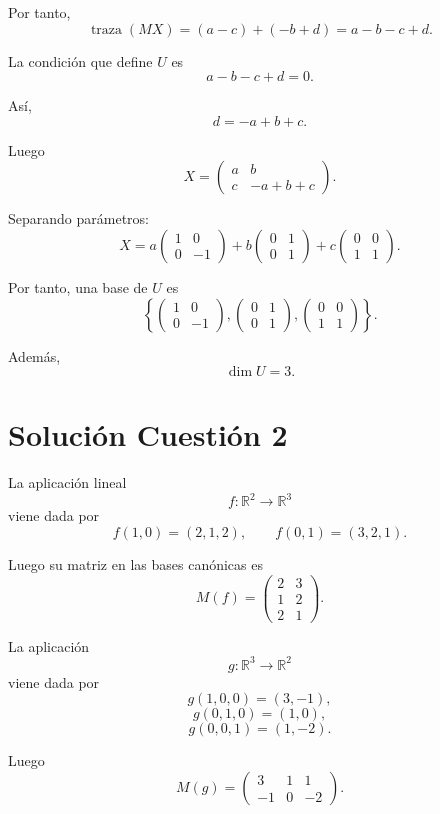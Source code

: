 \documentclass[12pt]{article}
\begin{document}
Por tanto,
\[
\operatorname{traza}(MX)=(a-c)+(-b+d)=a-b-c+d.
\]

La condición que define \(U\) es
\[
a-b-c+d=0.
\]

Así,
\[
d=-a+b+c.
\]

Luego
\[
X=
\begin{pmatrix}
a&b\\
c&-a+b+c
\end{pmatrix}.
\]

Separando parámetros:
\[
X=
a
\begin{pmatrix}
1&0\\
0&-1
\end{pmatrix}
+b
\begin{pmatrix}
0&1\\
0&1
\end{pmatrix}
+c
\begin{pmatrix}
0&0\\
1&1
\end{pmatrix}.
\]

Por tanto, una base de \(U\) es
\[
\boxed{
\left\{
\begin{pmatrix}
1&0\\
0&-1
\end{pmatrix},
\begin{pmatrix}
0&1\\
0&1
\end{pmatrix},
\begin{pmatrix}
0&0\\
1&1
\end{pmatrix}
\right\}.
}
\]

Además,
\[
\boxed{\dim U=3.}
\]

\section*{Solución Cuestión 2}

La aplicación lineal
\[
f:\mathbb{R}^2\longrightarrow\mathbb{R}^3
\]
viene dada por
\[
f(1,0)=(2,1,2),
\qquad
f(0,1)=(3,2,1).
\]

Luego su matriz en las bases canónicas es
\[
M(f)=
\begin{pmatrix}
2&3\\
1&2\\
2&1
\end{pmatrix}.
\]

La aplicación
\[
g:\mathbb{R}^3\longrightarrow\mathbb{R}^2
\]
viene dada por
\[
g(1,0,0)=(3,-1),
\]
\[
g(0,1,0)=(1,0),
\]
\[
g(0,0,1)=(1,-2).
\]

Luego
\[
M(g)=
\begin{pmatrix}
3&1&1\\
-1&0&-2
\end{pmatrix}.
\]
\end{document}
